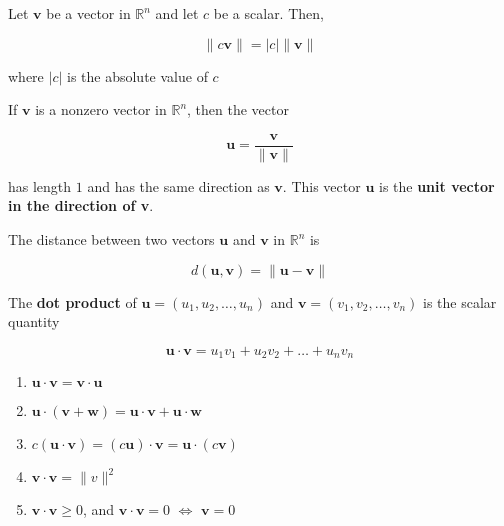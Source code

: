 \documentclass{report}
\begin{document}
\begin{tcolorbox}[title = Length of a Scalar Multiple]
	Let $\bm{v}$ be a vector in $\mathbb{R}^n$ and let $c$ be a scalar. Then,
	
	$$
	\| c\bm{v} \| = |c| \| \bm{v} \|
	$$

	where $|c|$ is the absolute value of $c$
	
\end{tcolorbox}

\begin{tcolorbox}[title = Unit Vector in the Direction of $\bm{v}$]
	If $\bm{v}$ is a nonzero vector in $\mathbb{R}^n$, then the vector
	
	$$
	\bm{u} = \frac{\bm{v}} {\| \bm{v} \|}	
	$$
	
	has length $1$ and has the same direction as $\bm{v}$. This vector $\bm{u}$ is the \textbf{unit vector in the direction of  v}.
\end{tcolorbox}

\begin{tcolorbox}[title = Definition of Distance Between Two Vectors]
	The distance between two vectors $\bm{u}$ and $\bm{v}$ in $\mathbb{R}^n$ is
	
	$$
	d(\bm{u},\bm{v}) = \| \bm{u} - \bm{v} \|
	$$
\end{tcolorbox}

\begin{tcolorbox}[title = Definition of Dot Product in $\mathbb{R}^n$]
	The \textbf{dot product} of $\bm{u} = (u_1, u_2, \hdots, u_n)$ and $\bm{v} = (v_1, v_2, \hdots, v_n)$ is the scalar quantity
	
	$$
	\bm{u} \cdot \bm{v} = u_1 v_1 + u_2 v_2 + \hdots + u_n v_n
	$$
\end{tcolorbox}

\begin{tcolorbox}[title = Properties of the Dot Product]
	\begin{enumerate}
			\item $\bm{u} \cdot \bm{v} = \bm{v} \cdot \bm{u}$
			\item $\bm{u} \cdot (\bm{v} + \bm{w}) = \bm{u} \cdot \bm{v} + \bm{u} \cdot \bm{w}$
			\item $c(\bm{u} \cdot \bm{v}) = (c\bm{u}) \cdot \bm{v} = \bm{u} \cdot (c\bm{v})$
			\item $\bm{v} \cdot \bm{v} = \| v \| ^2 $
			\item $\bm{v} \cdot \bm{v} \ge 0$, and $\bm{v} \cdot \bm{v} = 0$ $\iff$ $\bm{v} = 0$
	\end{enumerate}
\end{tcolorbox}
\end{document}
